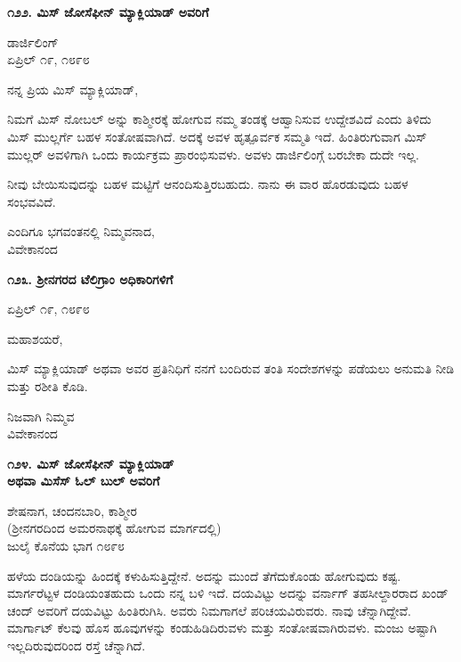 \begin{center}
\textbf{೧೨೨. ಮಿಸ್ ಜೋಸೆಫೀನ್ ಮ್ಯಾಕ್ಲಿಯಾಡ್ ಅವರಿಗೆ}
\end{center}

\begin{flushright}
ಡಾರ್ಜಿಲಿಂಗ್\\ಏಪ್ರಿಲ್ ೧೯, ೧೮೯೮
\end{flushright}

ನನ್ನ ಪ್ರಿಯ ಮಿಸ್ ಮ್ಯಾಕ್ಲಿಯಾಡ್,

ನಿಮಗೆ ಮಿಸ್ ನೋಬಲ್ ಅನ್ನು ಕಾಶ್ಮೀರಕ್ಕೆ ಹೋಗುವ ನಮ್ಮ ತಂಡಕ್ಕೆ ಆಹ್ವಾನಿಸುವ ಉದ್ದೇಶವಿದೆ ಎಂದು ತಿಳಿದು ಮಿಸ್ ಮುಲ್ಲರ್ಗೆ ಬಹಳ ಸಂತೋಷವಾಗಿದೆ. ಅದಕ್ಕೆ ಅವಳ ಹೃತ್ಪೂರ್ವಕ ಸಮ್ಮತಿ ಇದೆ. ಹಿಂತಿರುಗುವಾಗ ಮಿಸ್ ಮುಲ್ಲರ್ ಅವಳಿಗಾಗಿ ಒಂದು ಕಾರ್ಯಕ್ರಮ ಪ್ರಾರಂಭಿಸುವಳು. ಅವಳು ಡಾರ್ಜಿಲಿಂಗ್ಗೆ ಬರಬೇಕಾ ದುದೇ ಇಲ್ಲ.

ನೀವು ಬೇಯಿಸುವುದನ್ನು ಬಹಳ ಮಟ್ಟಿಗೆ ಆನಂದಿಸುತ್ತಿರಬಹುದು. ನಾನು ಈ ವಾರ ಹೊರಡುವುದು ಬಹಳ ಸಂಭವವಿದೆ.

\begin{flushright}
ಎಂದಿಗೂ ಭಗವಂತನಲ್ಲಿ ನಿಮ್ಮವನಾದ,\\ವಿವೇಕಾನಂದ
\end{flushright}

\begin{center}
\textbf{೧೨೩. ಶ‍್ರೀನಗರದ ಟೆಲಿಗ್ರಾಂ ಅಧಿಕಾರಿಗಳಿಗೆ}
\end{center}

\begin{flushright}
ಏಪ್ರಿಲ್ ೧೯, ೧೮೯೮
\end{flushright}

ಮಹಾಶಯರೆ,

ಮಿಸ್ ಮ್ಯಾಕ್ಲಿಯಾಡ್ ಅಥವಾ ಅವರ ಪ್ರತಿನಿಧಿಗೆ ನನಗೆ ಬಂದಿರುವ ತಂತಿ ಸಂದೇಶಗಳನ್ನು ಪಡೆಯಲು ಅನುಮತಿ ನೀಡಿ ಮತ್ತು ರಶೀತಿ ಕೊಡಿ.

\begin{flushright}
ನಿಜವಾಗಿ ನಿಮ್ಮವ\\ವಿವೇಕಾನಂದ
\end{flushright}

\begin{center}
\textbf{೧೨೪. ಮಿಸ್ ಜೋಸೆಫೀನ್ ಮ್ಯಾಕ್ಲಿಯಾಡ್\\ಅಥವಾ ಮಿಸೆಸ್ ಓಲ್ ಬುಲ್ ಅವರಿಗೆ}
\end{center}

\begin{flushright}
ಶೇಷನಾಗ, ಚಂದನಬಾರಿ, ಕಾಶ್ಮೀರ\\(ಶ‍್ರೀನಗರದಿಂದ ಅಮರನಾಥಕ್ಕೆ ಹೋಗುವ ಮಾರ್ಗದಲ್ಲಿ)\\ಜುಲೈ ಕೊನೆಯ ಭಾಗ ೧೮೯೮
\end{flushright}

ಹಳೆಯ ದಂಡಿಯನ್ನು ಹಿಂದಕ್ಕೆ ಕಳುಹಿಸುತ್ತಿದ್ದೇನೆ. ಅದನ್ನು ಮುಂದೆ ತೆಗೆದುಕೊಂಡು ಹೋಗುವುದು ಕಷ್ಟ. ಮಾರ್ಗರೆಟ್ಟಳ ದಂಡಿಯಂತಹುದು ಒಂದು ನನ್ನ ಬಳಿ ಇದೆ. ದಯವಿಟ್ಟು ಅದನ್ನು ವರ್ನಾಗ್ ತಹಸೀಲ್ದಾರರಾದ ಖಂಡ್ ಚಂದ್ ಅವರಿಗೆ ದಯವಿಟ್ಟು ಹಿಂತಿರುಗಿಸಿ. ಅವರು ನಿಮಗಾಗಲೆ ಪರಿಚಯವಿರುವರು. ನಾವು ಚೆನ್ನಾಗಿದ್ದೇವೆ. ಮಾರ್ಗಾಟ್ ಕೆಲವು ಹೊಸ ಹೂವುಗಳನ್ನು ಕಂಡುಹಿಡಿದಿರುವಳು ಮತ್ತು ಸಂತೋಷವಾಗಿರುವಳು. ಮಂಜು ಅಷ್ಟಾಗಿ ಇಲ್ಲದಿರುವುದರಿಂದ ರಸ್ತೆ ಚೆನ್ನಾಗಿದೆ.

